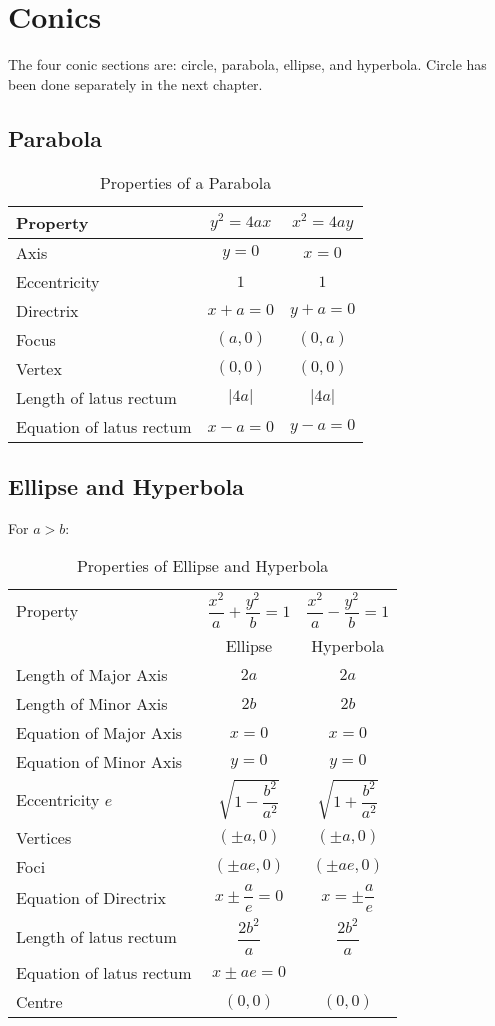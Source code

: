\large{\chapter{Conics}}
The four conic sections are: circle, parabola, ellipse, and hyperbola. Circle has been done separately in the next chapter.

\section{Parabola}
\begin{table}[H]
	\caption{Properties of a Parabola}
	\label{parabola}
	\begin{center}
		\begin{tabular}{l|c|c}
			Property&$y^2=4ax$&$x^2=4ay$\\
			\hline
			Axis&$y=0$&$x=0$\\
			Eccentricity&$1$&$1$\\
			Directrix&$x+a=0$&$y+a=0$\\
			Focus&$(a,0)$&$(0,a)$\\
			Vertex&$(0,0)$&$(0,0)$\\
			Length of latus rectum&$\lvert 4a \rvert$&$\lvert 4a \rvert$\\
			Equation of latus rectum&$x-a=0$&$y-a=0$\\
		\end{tabular}
	\end{center}
\end{table}

\section{Ellipse and Hyperbola}
For $a>b$:
\begin{table}[H]
	\begin{center}
		\caption{Properties of Ellipse and Hyperbola}
		\label{ell&hyp}
		\begin{tabular}{l|c|c}
			Property&$\dfrac{x^2}{a}+\dfrac{y^2}{b}=1$&$\dfrac{x^2}{a}-\dfrac{y^2}{b}=1$\\
			&Ellipse&Hyperbola\\
			\hline
			Length of Major Axis&$2a$&$2a$\\
			Length of Minor Axis&$2b$&$2b$\\
			Equation of Major Axis&$x=0$&$x=0$\\
			Equation of Minor Axis&$y=0$&$y=0$\\
			Eccentricity $e$&$\sqrt{1-\dfrac{b^2}{a^2}}$&$\sqrt{1+\dfrac{b^2}{a^2}}$\\
			Vertices&$(\pm a,0)$&$(\pm a,0)$\\
			Foci&$(\pm ae,0)$&$(\pm ae,0)$\\
			Equation of Directrix&$x \pm \dfrac{a}{e}=0$ &$x=\pm\dfrac{a}{e}$\\
			Length of latus rectum&$\dfrac{2b^2}{a}$&$\dfrac{2b^2}{a}$\\
			Equation of latus rectum&$x \pm ae=0$& \\
			Centre&$(0,0)$&$(0,0)$
		\end{tabular}
	\end{center}
\end{table}

